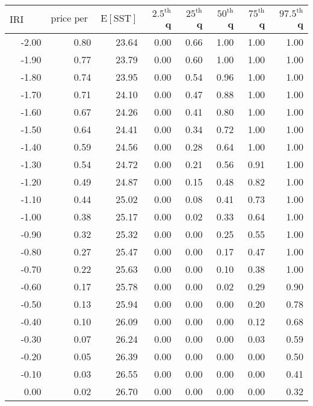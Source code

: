 \begin{table*}[ht]
\centering \footnotesize
\begin{tabular}{rrrrrrrr}
  \hline
$\mbox{IRI anom}$ & $\mbox{price per USD}$ & $\mbox{E}[\mbox{SST}]$ & $2.5^{\mbox{th}}$ q & $25^{\mbox{th}}$ q & $50^{\mbox{th}}$ q & $75^{\mbox{th}}$ q & $97.5^{\mbox{th}}$ q \\ 
  \hline
-2.00 & 0.80 & 23.64 & 0.00 & 0.66 & 1.00 & 1.00 & 1.00 \\ 
  -1.90 & 0.77 & 23.79 & 0.00 & 0.60 & 1.00 & 1.00 & 1.00 \\ 
  -1.80 & 0.74 & 23.95 & 0.00 & 0.54 & 0.96 & 1.00 & 1.00 \\ 
  -1.70 & 0.71 & 24.10 & 0.00 & 0.47 & 0.88 & 1.00 & 1.00 \\ 
  -1.60 & 0.67 & 24.26 & 0.00 & 0.41 & 0.80 & 1.00 & 1.00 \\ 
  -1.50 & 0.64 & 24.41 & 0.00 & 0.34 & 0.72 & 1.00 & 1.00 \\ 
  -1.40 & 0.59 & 24.56 & 0.00 & 0.28 & 0.64 & 1.00 & 1.00 \\ 
  -1.30 & 0.54 & 24.72 & 0.00 & 0.21 & 0.56 & 0.91 & 1.00 \\ 
  -1.20 & 0.49 & 24.87 & 0.00 & 0.15 & 0.48 & 0.82 & 1.00 \\ 
  -1.10 & 0.44 & 25.02 & 0.00 & 0.08 & 0.41 & 0.73 & 1.00 \\ 
  -1.00 & 0.38 & 25.17 & 0.00 & 0.02 & 0.33 & 0.64 & 1.00 \\ 
  -0.90 & 0.32 & 25.32 & 0.00 & 0.00 & 0.25 & 0.55 & 1.00 \\ 
  -0.80 & 0.27 & 25.47 & 0.00 & 0.00 & 0.17 & 0.47 & 1.00 \\ 
  -0.70 & 0.22 & 25.63 & 0.00 & 0.00 & 0.10 & 0.38 & 1.00 \\ 
  -0.60 & 0.17 & 25.78 & 0.00 & 0.00 & 0.02 & 0.29 & 0.90 \\ 
  -0.50 & 0.13 & 25.94 & 0.00 & 0.00 & 0.00 & 0.20 & 0.78 \\ 
  -0.40 & 0.10 & 26.09 & 0.00 & 0.00 & 0.00 & 0.12 & 0.68 \\ 
  -0.30 & 0.07 & 26.24 & 0.00 & 0.00 & 0.00 & 0.03 & 0.59 \\ 
  -0.20 & 0.05 & 26.39 & 0.00 & 0.00 & 0.00 & 0.00 & 0.50 \\ 
  -0.10 & 0.03 & 26.55 & 0.00 & 0.00 & 0.00 & 0.00 & 0.41 \\ 
  0.00 & 0.02 & 26.70 & 0.00 & 0.00 & 0.00 & 0.00 & 0.32 \\ 

\end{tabular}
\end{table*}
